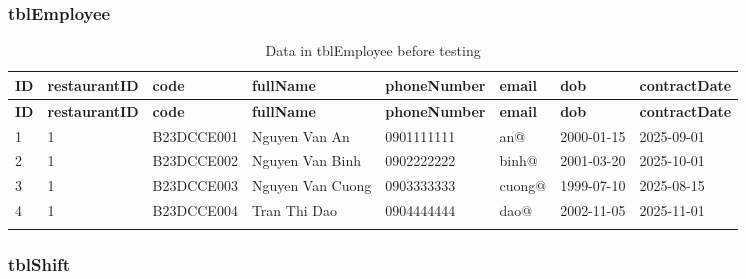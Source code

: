 \subsubsection*{tblEmployee}

\begin{longtable}{|p{}|p{}|p{}|p{}|p{}|p{}|p{}|p{}|}
\hline
\textbf{ID} & \textbf{restaurantID} & \textbf{code} & \textbf{fullName} & \textbf{phoneNumber} & \textbf{email} & \textbf{dob} & \textbf{contractDate} \\
\hline
\endfirsthead
\hline
\textbf{ID} & \textbf{restaurantID} & \textbf{code} & \textbf{fullName} & \textbf{phoneNumber} & \textbf{email} & \textbf{dob} & \textbf{contractDate} \\
\hline
\endhead
1 & 1 & B23DCCE001 & Nguyen Van An & 0901111111 & an@ & 2000-01-15 & 2025-09-01 \\
\hline
2 & 1 & B23DCCE002 & Nguyen Van Binh & 0902222222 & binh@ & 2001-03-20 & 2025-10-01 \\
\hline
3 & 1 & B23DCCE003 & Nguyen Van Cuong & 0903333333 & cuong@ & 1999-07-10 & 2025-08-15 \\
\hline
4 & 1 & B23DCCE004 & Tran Thi Dao & 0904444444 & dao@ & 2002-11-05 & 2025-11-01 \\
\hline
\caption{Data in tblEmployee before testing}\label{tab:testing-employee-before}
\end{longtable}

\subsubsection*{tblShift}

